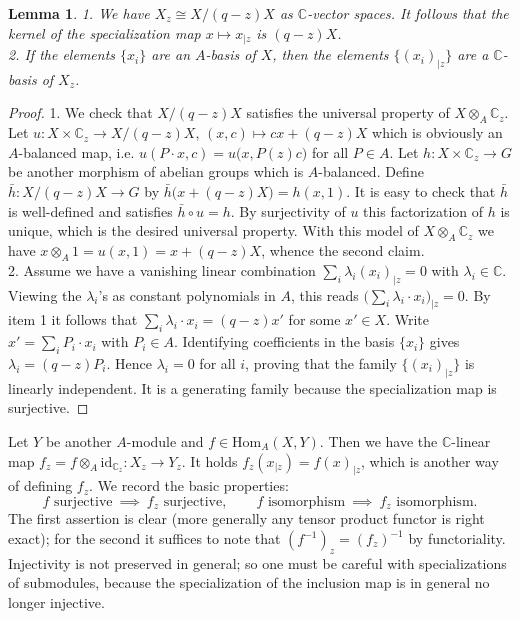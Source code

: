 \documentclass[11pt]{amsart}
\newtheorem{lem}[teo]{Lemma}
\begin{document}
\begin{lem}\label{lemmaSpecialisation}
1. We have $X_z \cong X\big/(q-z)X$ as $\mathbb{C}$-vector spaces. It follows that the kernel of the specialization map $x \mapsto x_{|z}$ is $(q-z)X$.
\\2. If the elements $\{ x_i \}$ are an $A$-basis of $X$, then the elements $\{ (x_i)_{|z} \}$ are a $\mathbb{C}$-basis of $X_z$.
\end{lem}
\begin{proof}
1. We check that $X\big/(q-z)X$ satisfies the universal property of $X \otimes_A \mathbb{C}_z$. Let $u : X \times \mathbb{C}_z \to X\big/(q-z)X$, $(x,c) \mapsto cx + (q-z)X$ which is obviously an $A$-balanced map, i.e. $u(P\cdot x,c) = u\bigl( x, P(z)c \bigr)$ for all $P \in A$. Let $h : X \times \mathbb{C}_z \to G$ be another morphism of abelian groups which is $A$-balanced. Define $\bar{h} : X\big/(q-z)X \to G$ by $\bar{h}\bigl(x + (q-z)X \bigr) = h(x,1)$. It is easy to check that $\bar{h}$ is well-defined and satisfies $\bar{h} \circ u = h$. By surjectivity of $u$ this factorization of $h$ is unique, which is the desired universal property. With this model of $X \otimes_A \mathbb{C}_z$ we have $x \otimes_A 1 = u(x,1) = x + (q-z)X$, whence the second claim.
\\2. Assume we have a vanishing linear combination $\textstyle \sum_i \lambda_i (x_i)_{|z} = 0$ with $\lambda_i \in \mathbb{C}$. Viewing the $\lambda_i$'s as constant polynomials in $A$, this reads $\textstyle \bigl( \sum_i \lambda_i \cdot x_i \bigr)_{|z} = 0$. By item 1 it follows that $\textstyle \sum_i \lambda_i \cdot x_i = (q-z)x'$ for some $x' \in X$. Write $x' = \textstyle \sum_i P_i \cdot x_i$ with $P_i \in A$. Identifying coefficients in the basis $\{x_i\}$ gives $\lambda_i = (q-z)P_i$. Hence $\lambda_i = 0$ for all $i$, proving that the family $\{ (x_i)_{|z} \}$ is linearly independent. It is a generating family because the specialization map is surjective.
\end{proof}

\indent Let $Y$ be another $A$-module and $f \in \mathrm{Hom}_A(X,Y)$. Then we have the $\mathbb{C}$-linear map $f_z = f \otimes_A \mathrm{id}_{\mathbb{C}_z} : X_z \to Y_z$. It holds $f_z(x_{|z}) = f(x)_{|z}$, which is another way of defining $f_z$. We record the basic properties:
\begin{equation}\label{speSurjAndIso}
f \text{ surjective} \: \implies \: f_z \text{ surjective}, \qquad f \text{ isomorphism} \: \implies \: f_z \text{ isomorphism}.
\end{equation}
The first assertion is clear (more generally any tensor product functor is right exact); for the second it suffices to note that $(f^{-1})_z = (f_z)^{-1}$ by functoriality. Injectivity is not preserved in general; so one must be careful with specializations of submodules, because the specialization of the inclusion map is in general no longer injective.
\end{document}
